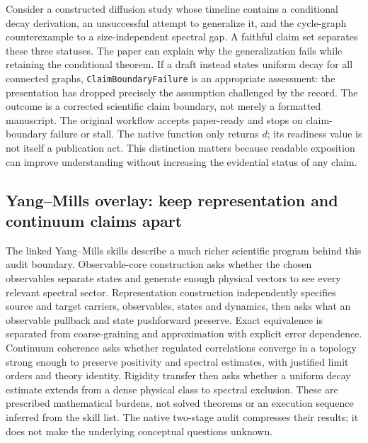 Consider a constructed diffusion study whose timeline contains a conditional
decay derivation, an unsuccessful attempt to generalize it, and the cycle-graph
counterexample to a size-independent spectral gap. A faithful claim set separates
these three statuses. The paper can explain why the generalization fails while
retaining the conditional theorem. If a draft instead states uniform decay for
all connected graphs, \texttt{Claim\allowbreak Boundary\allowbreak Failure} is an appropriate assessment:
the presentation has dropped precisely the assumption challenged by the record.
The outcome is a corrected scientific claim boundary, not merely a formatted
manuscript. The original workflow accepts paper-ready and stops on claim-boundary
failure or stall. The native function only returns $d$; its readiness value is
not itself a publication act. This distinction matters because readable exposition
can improve understanding without increasing the evidential status of any claim.



\subsection{Yang--Mills overlay: keep representation and continuum claims apart}
\label{app:granular-ym-representational-dynamics-overlay}
The linked Yang--Mills skills describe a much richer scientific program behind
this audit boundary. Observable-core construction asks whether the chosen
observables separate states and generate enough physical vectors to see every
relevant spectral sector. Representation construction independently specifies
source and target carriers, observables, states and dynamics, then asks what an
observable pullback and state pushforward preserve. Exact equivalence is
separated from coarse-graining and approximation with explicit error dependence.
Continuum coherence asks whether regulated correlations converge in a topology
strong enough to preserve positivity and spectral estimates, with justified limit
orders and theory identity. Rigidity transfer then asks whether a uniform decay
estimate extends from a dense physical class to spectral exclusion. These are
prescribed mathematical burdens, not solved theorems or an execution sequence
inferred from the skill list. The native two-stage audit compresses their results;
it does not make the underlying conceptual questions unknown.


